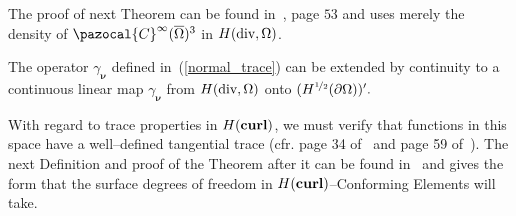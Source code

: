 The proof of next Theorem can be found in~\cite{monk}, page $53$ and uses merely
the density of $\pazocal{C}^\infty(\overline{\Omega})^3$ in $H(\operatorname{\textrm{div}},\Omega)$.
\begin{theorem} The operator $\gamma_{\boldsymbol{\nu}}$ defined in~(\ref{normal_trace})
can be extended by continuity to a continuous linear map $\gamma_{\boldsymbol{\nu}}$ from
$H(\operatorname{\textrm{div}},\Omega)$ onto $(H^{\nicefrac12}(\partial\Omega))'.$
\end{theorem}
With regard to trace properties in $H(\textbf{curl})$, we must verify that
functions in this space have a well--defined tangential trace (cfr.
page 34 of~\cite{giraultRaviart} and page 59 of~\cite{monk}). The next Definition
and proof of the Theorem after it can be found in~\cite{chenDuZou} and gives the
form that the surface degrees of freedom in $H(\textbf{curl})$--Conforming
Elements will take.

